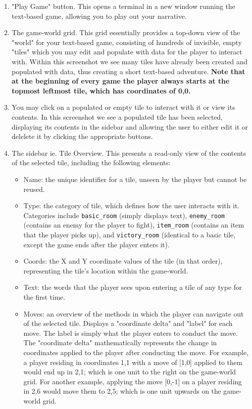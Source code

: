 \documentclass[class=article,crop=false]{standalone} \usepackage[margin=1in,headheight=57pt,headsep=0.1in]{geometry}
\begin{document}
\begin{enumerate}
	\item "Play Game" button. This opens a terminal in a new window running the text-based game, allowing you to play out your narrative.
	\item The game-world grid. This grid essentially provides a top-down view of the "world" for your text-based game, consisting of hundreds of invisible, empty "tiles" which you may edit and populate with data for the player to interact with. Within this screenshot we see many tiles have already been created and populated with data, thus creating a short text-based adventure. \textbf{Note that at the beginning of every game the player always starts at the topmost leftmost tile, which has coordinates of 0,0.}
	\item You may click on a populated or empty tile to interact with it or view its contents. In this screenshot we see a populated tile has been selected, displaying its contents in the sidebar and allowing the user to either edit it or delelete it by clicking the appropriate buttons.
	\item The sidebar ie. Tile Overview. This presents a read-only view of the contents of the selected tile, including the following elements:
		\begin{itemize}
			\item Name: the unique identifier for a tile, unseen by the player but cannot be reused.
			\item Type: the category of tile, which defines how the user interacts with it. Categories include \texttt{basic\_room} (simply displays text), \texttt{enemy\_room} (contains an enemy for the player to fight), \texttt{item\_room} (contains an item that the player picks up), and \texttt{victory\_room} (identical to a basic tile, except the game ends after the player enters it).
			\item Coords: the X and Y coordinate values of the tile (in that order), representing the tile's location within the game-world.
			\item Text: the words that the player sees upon entering a tile of any type for the first time.
			\item Moves: an overview of the methods in which the player can navigate out of the selected tile. Displays a "coordinate delta" and "label" for each move. The label is simply what the player enters to conduct the move. The "coordinate delta" mathematically represents the change in coordinates applied to the player after conducting the move. For example, a player residing in coordinates 1,1 with a move of [1,0] applied to them would end up in 2,1; which is one unit to the right on the game-world grid. For another example, applying the move [0,-1] on a player residing in 2,6 would move them to 2,5; which is one unit upwards on the game-world grid.

\end{itemize}
\end{enumerate}
\end{document}
